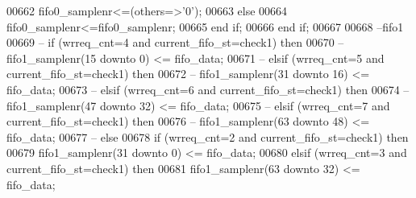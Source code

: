 \begin{DoxyCode}
00662               \textcolor{vhdlchar}{fifo0_samplenr}\textcolor{vhdlchar}{<=}\textcolor{vhdlchar}{(}\textcolor{keywordflow}{others}\textcolor{vhdlchar}{=}\textcolor{vhdlchar}{>}\textcolor{vhdlchar}{'}\textcolor{vhdllogic}{}\textcolor{vhdllogic}{0}\textcolor{vhdlchar}{'}\textcolor{vhdlchar}{)};
00663             \textcolor{keywordflow}{else}  
00664               \textcolor{vhdlchar}{fifo0_samplenr}\textcolor{vhdlchar}{<=}\textcolor{vhdlchar}{fifo0_samplenr};
00665             \textcolor{keywordflow}{end} \textcolor{keywordflow}{if};
00666           \textcolor{keywordflow}{end} \textcolor{keywordflow}{if};
00667             
00668 \textcolor{keyword}{          --fifo1                 }
00669 \textcolor{keyword}{--        if (wrreq\_cnt=4 and current\_fifo\_st=check1) then }
00670 \textcolor{keyword}{--          fifo1\_samplenr(15 downto 0) <= fifo\_data;}
00671 \textcolor{keyword}{--        elsif (wrreq\_cnt=5 and current\_fifo\_st=check1) then}
00672 \textcolor{keyword}{--          fifo1\_samplenr(31 downto 16) <= fifo\_data;}
00673 \textcolor{keyword}{--        elsif (wrreq\_cnt=6 and current\_fifo\_st=check1) then}
00674 \textcolor{keyword}{--          fifo1\_samplenr(47 downto 32) <= fifo\_data; }
00675 \textcolor{keyword}{--        elsif (wrreq\_cnt=7 and current\_fifo\_st=check1) then}
00676 \textcolor{keyword}{--          fifo1\_samplenr(63 downto 48) <= fifo\_data; }
00677 \textcolor{keyword}{--        else }
00678           \textcolor{keywordflow}{if} \textcolor{vhdlchar}{(}\textcolor{vhdlchar}{wrreq_cnt}\textcolor{vhdlchar}{=}\textcolor{vhdllogic}{}\textcolor{vhdllogic}{2} \textcolor{keywordflow}{and} \textcolor{vhdlchar}{current_fifo_st}\textcolor{vhdlchar}{=}\textcolor{vhdlchar}{check1}\textcolor{vhdlchar}{)} \textcolor{keywordflow}{then} 
00679             \textcolor{vhdlchar}{fifo1_samplenr}\textcolor{vhdlchar}{(}\textcolor{vhdllogic}{}\textcolor{vhdllogic}{31} \textcolor{keywordflow}{downto} \textcolor{vhdllogic}{}\textcolor{vhdllogic}{0}\textcolor{vhdlchar}{)} \textcolor{vhdlchar}{<=} \textcolor{vhdlchar}{fifo_data};
00680           \textcolor{keywordflow}{elsif} \textcolor{vhdlchar}{(}\textcolor{vhdlchar}{wrreq_cnt}\textcolor{vhdlchar}{=}\textcolor{vhdllogic}{}\textcolor{vhdllogic}{3} \textcolor{keywordflow}{and} \textcolor{vhdlchar}{current_fifo_st}\textcolor{vhdlchar}{=}\textcolor{vhdlchar}{check1}\textcolor{vhdlchar}{)} \textcolor{keywordflow}{then}
00681             \textcolor{vhdlchar}{fifo1_samplenr}\textcolor{vhdlchar}{(}\textcolor{vhdllogic}{}\textcolor{vhdllogic}{63} \textcolor{keywordflow}{downto} \textcolor{vhdllogic}{}\textcolor{vhdllogic}{32}\textcolor{vhdlchar}{)} \textcolor{vhdlchar}{<=} \textcolor{vhdlchar}{fifo_data}; 

\end{DoxyCode}
